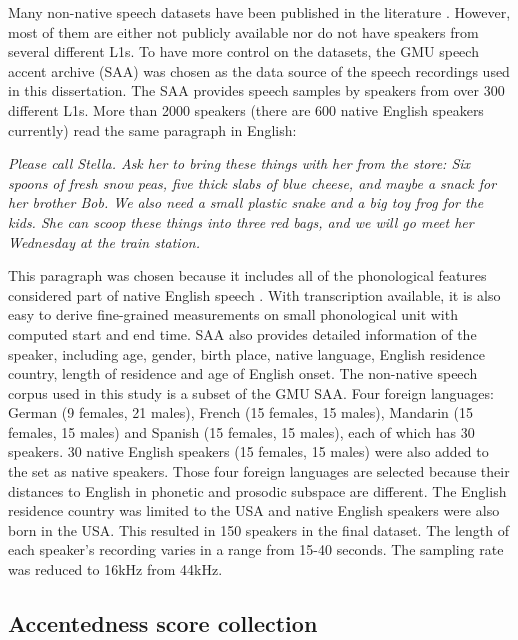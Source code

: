 Many non-native speech datasets have been published in the literature \citep{raab2007non}. However, most of them are either not publicly available nor do not have speakers from several different L1s. To have more control on the datasets, the GMU speech accent archive (SAA) \cite{weinberger2013speech} was chosen as the data source of the speech recordings used in this dissertation. The SAA provides speech samples by speakers from over 300 different L1s. More than 2000 speakers (there are 600 native English speakers currently) read the same paragraph in English:

\vspace{4pt}
\textit{Please call Stella.  Ask her to bring these things with her from the store:  Six spoons of fresh snow peas, five thick slabs of blue cheese, and maybe a snack for her brother Bob.  We also need a small plastic snake and a big toy frog for the kids.  She can scoop these things into three red bags, and we will go meet her Wednesday at the train station.}
\vspace{4pt}

This paragraph was chosen because it includes all of the phonological features considered part of native English speech \citep{kunath2010wisdom}. With transcription available, it is also easy to derive fine-grained measurements on small phonological unit with computed start and end time. SAA also provides detailed information of the speaker, including age, gender, birth place, native language, English residence country, length of residence and age of English onset. The non-native speech corpus used in this study is a subset of the GMU SAA. Four foreign languages: German (9 females, 21 males), French (15 females, 15 males), Mandarin (15 females, 15 males) and Spanish (15 females, 15 males), each of which has 30 speakers. 30 native English speakers (15 females, 15 males) were also added to the set as native speakers. Those four foreign languages are selected because their distances to English in phonetic and prosodic subspace are different. The English residence country was limited to the USA and native English speakers were also born in the USA. This resulted in 150 speakers in the final dataset. The length of each speaker's recording varies in a range from 15-40 seconds. The sampling rate was reduced to 16kHz from 44kHz.



\subsection{Accentedness score collection}

